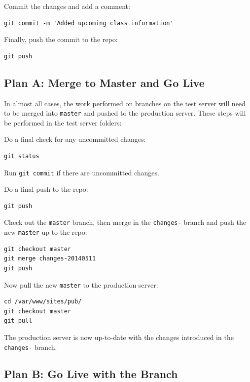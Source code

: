 \documentclass[pdflatex,letterpaper,twoside,12pt]{book}
\begin{document}
Commit the changes and add a comment:

\begin{verbatim}
git commit -m 'Added upcoming class information'
\end{verbatim}

Finally, push the commit to the repo:

\begin{verbatim}
git push
\end{verbatim}

\subsection{Plan A: Merge to Master and Go Live}\label{publish-plan-a}

In almost all cases, the work performed on branches on the test server will need to be merged into \texttt{master} and pushed to the production server.  These steps will be performed in the test server folders:

Do a final check for any uncommitted changes:

\begin{verbatim}
git status
\end{verbatim}

Run \texttt{git commit} if there are uncommitted changes.

Do a final push to the repo:

\begin{verbatim}
git push
\end{verbatim}

Check out the \texttt{master} branch, then merge in the \texttt{changes-} branch and push the new \texttt{master} up to the repo:

\begin{verbatim}
git checkout master
git merge changes-20140511
git push
\end{verbatim}

Now pull the new \texttt{master} to the production server:

\begin{verbatim}
cd /var/www/sites/pub/
git checkout master
git pull
\end{verbatim}

The production server is now up-to-date with the changes introduced in the \texttt{changes-} branch.

\subsection{Plan B: Go Live with the Branch}
\end{document}
